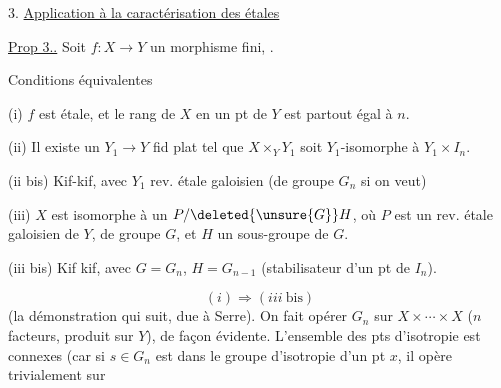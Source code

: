 3. \uline{Application à la caractérisation des  étales }  


\uline{Prop 3..} Soit $f:X\to Y$ un morphisme fini, .

Conditions équivalentes

(i) $f$ est étale, et le rang de $X$ en un pt de $Y$ est partout égal à $n$.

(ii) Il existe un $Y_1\to Y$ fid plat tel que $X\times_Y Y_1$ soit $Y_1$-isomorphe à $Y_1\times I_n$.

(ii bis) Kif-kif, avec $Y_1$  rev. étale galoisien (de groupe $G_n$ si on veut)

(iii) $X$ est isomorphe à un $P/\deleted{\unsure{G}}H$, où $P$ est un rev. étale galoisien de $Y$, de groupe $G$, et $H$ un sous-groupe de $G$.

(iii bis) Kif kif, avec $G=G_n$, $H=G_{n-1}$  (stabilisateur d'un pt de $I_n$).



\[
(i)\Longrightarrow(iii\ \mathrm{bis})
\]
(la démonstration  qui suit, due à  Serre).
On fait opérer $G_n$ sur $X\times\cdots\times X$ ($n$ facteurs, produit sur $Y$), de façon évidente.
L'ensemble des pts d'isotropie est  connexes (car si $s\in G_n$ est dans le groupe d'isotropie d'un pt $x$, il opère trivialement sur
